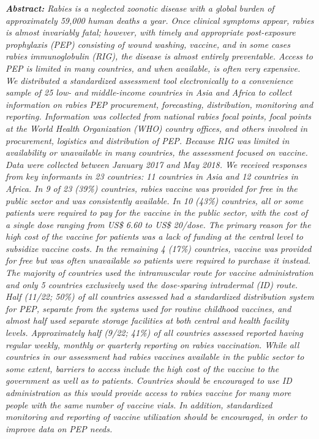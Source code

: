 \documentclass[
  oneside]{book}
\begin{document}
\begin{enumerate}
  \emph{\textbf{Abstract:} Rabies is a neglected zoonotic disease with a global burden of approximately 59,000 human deaths a year. Once clinical symptoms appear, rabies is almost invariably fatal; however, with timely and appropriate post-exposure prophylaxis (PEP) consisting of wound washing, vaccine, and in some cases rabies immunoglobulin (RIG), the disease is almost entirely preventable. Access to PEP is limited in many countries, and when available, is often very expensive. We distributed a standardized assessment tool electronically to a convenience sample of 25 low- and middle-income countries in Asia and Africa to collect information on rabies PEP procurement, forecasting, distribution, monitoring and reporting. Information was collected from national rabies focal points, focal points at the World Health Organization (WHO) country offices, and others involved in procurement, logistics and distribution of PEP. Because RIG was limited in availability or unavailable in many countries, the assessment focused on vaccine. Data were collected between January 2017 and May 2018. We received responses from key informants in 23 countries: 11 countries in Asia and 12 countries in Africa. In 9 of 23 (39\%) countries, rabies vaccine was provided for free in the public sector and was consistently available. In 10 (43\%) countries, all or some patients were required to pay for the vaccine in the public sector, with the cost of a single dose ranging from US\$ 6.60 to US\$ 20/dose. The primary reason for the high cost of the vaccine for patients was a lack of funding at the central level to subsidize vaccine costs. In the remaining 4 (17\%) countries, vaccine was provided for free but was often unavailable so patients were required to purchase it instead. The majority of countries used the intramuscular route for vaccine administration and only 5 countries exclusively used the dose-sparing intradermal (ID) route. Half (11/22; 50\%) of all countries assessed had a standardized distribution system for PEP, separate from the systems used for routine childhood vaccines, and almost half used separate storage facilities at both central and health facility levels. Approximately half (9/22; 41\%) of all countries assessed reported having regular weekly, monthly or quarterly reporting on rabies vaccination. While all countries in our assessment had rabies vaccines available in the public sector to some extent, barriers to access include the high cost of the vaccine to the government as well as to patients. Countries should be encouraged to use ID administration as this would provide access to rabies vaccine for many more people with the same number of vaccine vials. In addition, standardized monitoring and reporting of vaccine utilization should be encouraged, in order to improve data on PEP needs.}
\end{enumerate}
\end{document}
